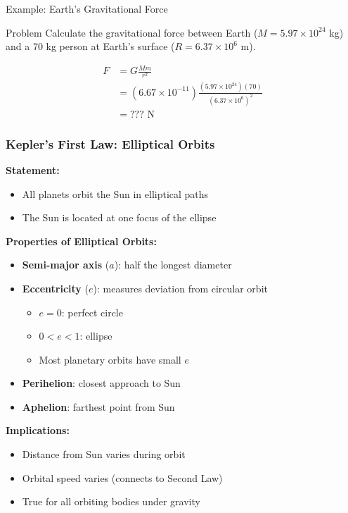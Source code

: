 \documentclass{beamer}
\begin{document}
\begin{frame}{Example: Earth's Gravitational Force}
    \begin{block}{Problem}
        Calculate the gravitational force between Earth ($M = 5.97 \times 10^{24}$ kg) and a 70 kg person at Earth's surface ($R = 6.37 \times 10^6$ m).
    \end{block}
    \begin{solution}
        \begin{align*}
            F &= G\frac{Mm}{r^2} \\
            &= (6.67 \times 10^{-11})\frac{(5.97 \times 10^{24})(70)}{(6.37 \times 10^6)^2} \\
            &= ??? \text{ N}
        \end{align*}
    \end{solution}
\end{frame}



\begin{frame}
\frametitle{Kepler's First Law: Elliptical Orbits}

\textbf{Statement:}
\begin{itemize}
    \item All planets orbit the Sun in elliptical paths
    \item The Sun is located at one focus of the ellipse
\end{itemize}

\textbf{Properties of Elliptical Orbits:}
\begin{itemize}
    \item \textbf{Semi-major axis} ($a$): half the longest diameter
    \item \textbf{Eccentricity} ($e$): measures deviation from circular orbit
    \begin{itemize}
        \item $e = 0$: perfect circle
        \item $0 < e < 1$: ellipse
        \item Most planetary orbits have small $e$
    \end{itemize}
    \item \textbf{Perihelion}: closest approach to Sun
    \item \textbf{Aphelion}: farthest point from Sun
\end{itemize}

\textbf{Implications:}
\begin{itemize}
    \item Distance from Sun varies during orbit
    \item Orbital speed varies (connects to Second Law)
    \item True for all orbiting bodies under gravity
\end{itemize}

\end{frame}
\end{document}
